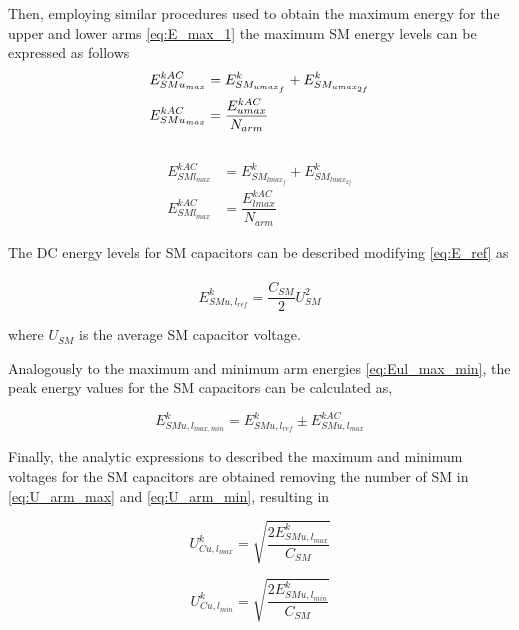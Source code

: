 \documentclass[journal]{IEEEtran}
\begin{document}
Then, employing similar procedures used to obtain the maximum energy for the upper and lower arms \eqref{eq:E_max_1} the maximum SM energy levels can be expressed as follows 
~
\begin{subequations}
\begin{align}
\centering
E_{SMu_{max}}^{kAC} &= E_{SM_{umax_{f}}}^k +  E_{SM_{umax_{2f}}}^k \\
E_{SMu_{max}}^{kAC} &=\dfrac{E_{umax}^{kAC}}{N_{arm}} 
\end{align}
\label{eq:SM_upper_E_max}
\end{subequations}
~
\begin{subequations}
\begin{align}
E_{SMl_{max}}^{kAC} &= E_{SM_{lmax_{f}}}^k +  E_{SM_{lmax_{2f}}}^k \\
E_{SMl_{max}}^{kAC} &= \dfrac{E_{lmax}^{kAC}}{N_{arm}} 
\end{align}
\label{eq:SM_lower_E_max}
\end{subequations}

The DC energy levels for SM capacitors can be described modifying \eqref{eq:E_ref} as
~
\begin{equation}
E_{SM{u,l_{ref}}}^k = \dfrac{C_{SM}}{2}U_{SM}^2
\label{eq:E_SM_ref}
\end{equation} 

\noindent where $U_{SM}$ is the average SM capacitor voltage.

Analogously to the maximum and minimum arm energies \eqref{eq:Eul_max_min}, the peak energy values for the SM capacitors can be calculated as, 

\begin{equation}
E_{SMu,l_{max,min}}^k = E_{SM{u,l_{ref}}}^k \pm E_{SMu,l_{max}}^{kAC}
\end{equation}

Finally, the analytic expressions to described the maximum and minimum voltages for the SM capacitors are obtained removing the number of SM in \eqref{eq:U_arm_max} and \eqref{eq:U_arm_min}, resulting in

\begin{equation}
U_{Cu,l_{max}}^k = \sqrt{\dfrac{2E_{SMu,l_{max}}^k}{C_{SM}}}
\label{eq:UC_max}
\end{equation}

\begin{equation}
U_{Cu,l_{min}}^k = \sqrt{\dfrac{2E_{SMu,l_{min}}^k}{C_{SM}}}
\label{eq:UC_min}
\end{equation}
\end{document}
